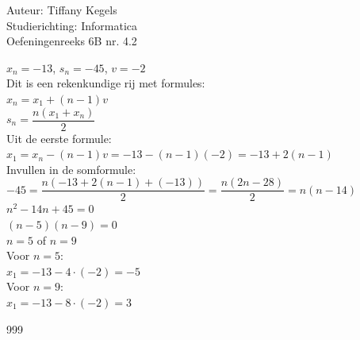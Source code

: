 \documentclass[a4paper]{article}
\begin{document}
  
\noindent \large Auteur: Tiffany Kegels \\
\noindent \large Studierichting: Informatica\\
\noindent \large Oefeningenreeks 6B nr. 4.2\\

\medskip

\normalsize

$x_n = -13$, $s_n = -45$, $v = -2$\\

Dit is een rekenkundige rij met formules:\\

$x_n = x_1 + (n-1)v$\\

$s_n = \dfrac{n(x_1 + x_n)}{2}$\\

Uit de eerste formule:\\

$x_1 = x_n - (n-1)v = -13 - (n-1)(-2) = -13 + 2(n-1)$\\

Invullen in de somformule:\\

$-45 = \dfrac{n\left(-13 + 2(n-1) + (-13)\right)}{2} = \dfrac{n(2n-28)}{2} = n(n-14)$\\

$n^2 - 14n + 45 = 0$\\

$(n-5)(n-9) = 0$\\

$n = 5$ of $n = 9$\\

Voor $n=5$:\\

$x_1 = -13 - 4\cdot(-2) = -5$\\

Voor $n=9$:\\

$x_1 = -13 - 8\cdot(-2) = 3$


\begin{thebibliography}{999}

\end{thebibliography}
\end{document}
